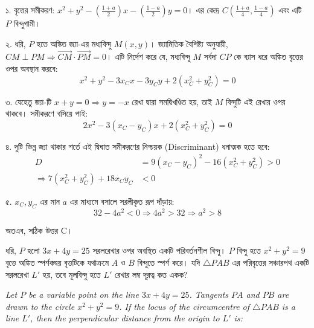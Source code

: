 \documentclass[12pt, a4paper]{article}
\begin{document}
\begin{tcolorbox}[solutionbox={সমাধান (Solution)}]
    \noindent
    ১. বৃত্তের সমীকরণ: $x^2 + y^2 - \left(\frac{1+a}{2}\right)x - \left(\frac{1-a}{2}\right)y = 0$। 
    এর কেন্দ্র $C\left(\frac{1+a}{4}, \frac{1-a}{4}\right)$ এবং এটি $P$ বিন্দুগামী।
    
    \vspace{0.5em}
    ২. ধরি, $P$ হতে অঙ্কিত জ্যা-এর মধ্যবিন্দু $M(x, y)$। জ্যামিতিক বৈশিষ্ট্য অনুযায়ী, $CM \perp PM \Rightarrow \vec{CM} \cdot \vec{PM} = 0$। এটি নির্দেশ করে যে, মধ্যবিন্দু $M$ সর্বদা $CP$ কে ব্যাস ধরে অঙ্কিত বৃত্তের ওপর অবস্থান করবে:
    \[ x^2 + y^2 - 3x_C x - 3y_C y + 2(x_C^2 + y_C^2) = 0 \]
    
    \vspace{0.5em}
    ৩. যেহেতু জ্যা-টি $x + y = 0 \Rightarrow y = -x$ রেখা দ্বারা সমদ্বিখণ্ডিত হয়, তাই $M$ বিন্দুটি এই রেখার ওপর থাকবে। সমীকরণে বসিয়ে পাই:
    \[ 2x^2 - 3(x_C - y_C)x + 2(x_C^2 + y_C^2) = 0 \]
    
    \vspace{0.5em}
    ৪. দুটি ভিন্ন জ্যা থাকার শর্তে এই দ্বিঘাত সমীকরণের নিশ্চয়ক (Discriminant) ধনাত্মক হতে হবে:
    \begin{align*}
        D &= 9(x_C - y_C)^2 - 16(x_C^2 + y_C^2) > 0 \\
        \Rightarrow 7(x_C^2 + y_C^2) + 18x_C y_C &< 0
    \end{align*}
    
    \vspace{0.5em}
    ৫. $x_C, y_C$ এর মান $a$ এর মাধ্যমে বসালে সরলীকৃত রূপ দাঁড়ায়:
    \[ 32 - 4a^2 < 0 \Rightarrow 4a^2 > 32 \Rightarrow a^2 > 8 \]
    
    \vspace{0.5em}
    অতএব, সঠিক উত্তর C।
\end{tcolorbox}
\vspace{2em}
\begin{tcolorbox}[questionbox={প্রশ্ন (Question) 7}]
    \noindent
    ধরি, $P$ হলো $3x + 4y = 25$ সরলরেখার ওপর অবস্থিত একটি পরিবর্তনশীল বিন্দু। $P$ বিন্দু হতে $x^2 + y^2 = 9$ বৃত্তে অঙ্কিত স্পর্শকদ্বয় বৃত্তটিকে যথাক্রমে $A$ ও $B$ বিন্দুতে স্পর্শ করে। যদি $\triangle PAB$ এর পরিবৃত্তের সঞ্চারপথ একটি সরলরেখা $L'$ হয়, তবে মূলবিন্দু হতে $L'$ রেখার লম্ব দূরত্ব কত একক?
    
    \vspace{0.8em}
    \begin{english}
    \noindent\textit{\color{darkgray}
    Let $P$ be a variable point on the line $3x + 4y = 25$. Tangents $PA$ and $PB$ are drawn to the circle $x^2 + y^2 = 9$. If the locus of the circumcentre of $\triangle PAB$ is a line $L'$, then the perpendicular distance from the origin to $L'$ is:
    }
    \end{english}
\end{tcolorbox}
\end{document}
